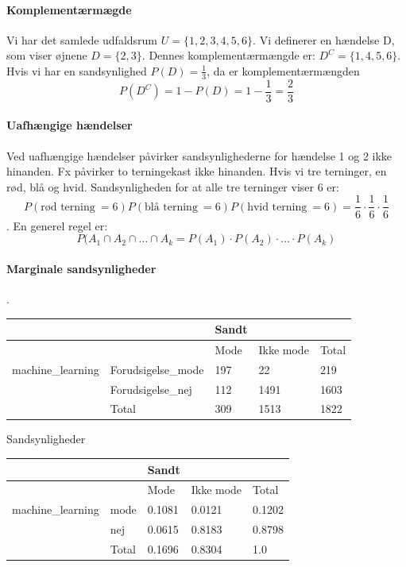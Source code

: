 \documentclass{article}
\begin{document}
\paragraph{Komplementærmægde}
Vi har det samlede udfaldsrum $U = \{1, 2, 3,4,5,6\}$.  Vi definerer en hændelse
D, som viser øjnene $D = \{2,3\}$. Dennes komplementærmængde er: $D^{C} =
\{1,4,5,6\}$. Hvis vi har en sandsynlighed $P(D) = \frac{1}{3}$, da er
komplementærmængden $$P(D^C) = 1 - P(D) = 1 - \frac{1}{3} = \frac{2}{3}$$

\paragraph{Uafhængige hændelser}
Ved uafhængige hændelser påvirker sandsynlighederne for hændelse 1 og 2 ikke
hinanden. Fx påvirker to terningekast ikke hinanden. Hvis vi tre terninger, en
rød, blå og hvid. Sandsynligheden for at alle tre terninger viser 6 er:
$$P(\text{rød terning} \ =6)P(\text{blå terning} \ =6)P(\text{hvid terning} \
=6) = \frac{1}{6}\cdot \frac{1}{6} \cdot\frac{1}{6}$$.
En generel regel er:
$$P(A_1 \cap A_2 \cap \dots \cap A_k = P(A_1) \cdot P(A_2) \cdot \dots \cdot
P(A_k) $$

\paragraph{Marginale sandsynligheder}.

\begin{table}[h]
  \centering
  \begin{tabular}{l|l|l|l|l}
   &                    & Sandt  &           &        \\\hline
   &                                       & Mode   & Ikke mode & Total  \\\hline
   machine\_learning & Forudsigelse\_mode & 197 & 22    & 219 \\\hline
   & Forudsigelse\_nej  & 112 & 1491    & 1603 \\\hline
   & Total              & 309 & 1513    & 1822   
  \end{tabular}
\end{table}

Sandsynligheder

\begin{table}[H]
  \centering
  \begin{tabular}{l|l|l|l|l}
   &                    & Sandt  &           &        \\\hline
   &                                       & Mode   & Ikke mode & Total  \\\hline
   machine\_learning & mode & 0.1081 & 0.0121    & 0.1202 \\\hline
   & nej  & 0.0615 & 0.8183    & 0.8798 \\\hline
   & Total              & 0.1696 & 0.8304    & 1.0   
  \end{tabular}
\end{table}
\end{document}
